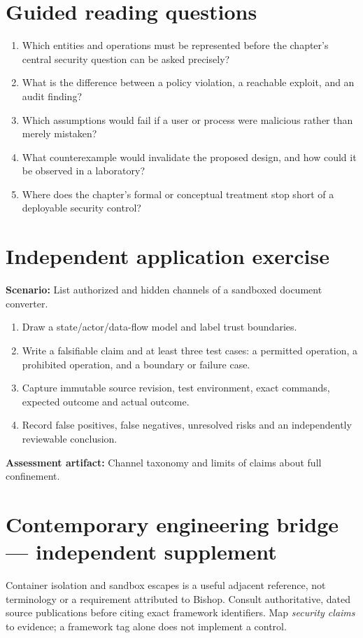\documentclass[10pt,letterpaper]{article}
\begin{document}
\section{Guided reading questions}
\begin{enumerate}
\item Which entities and operations must be represented before the chapter's central security question can be asked precisely?
\item What is the difference between a policy violation, a reachable exploit, and an audit finding?
\item Which assumptions would fail if a user or process were malicious rather than merely mistaken?
\item What counterexample would invalidate the proposed design, and how could it be observed in a laboratory?
\item Where does the chapter's formal or conceptual treatment stop short of a deployable security control?
\end{enumerate}
\section{Independent application exercise}
\textbf{Scenario:} List authorized and hidden channels of a sandboxed document converter.
\begin{enumerate}
\item Draw a state/actor/data-flow model and label trust boundaries.
\item Write a falsifiable claim and at least three test cases: a permitted operation, a prohibited operation, and a boundary or failure case.
\item Capture immutable source revision, test environment, exact commands, expected outcome and actual outcome.
\item Record false positives, false negatives, unresolved risks and an independently reviewable conclusion.
\end{enumerate}
\textbf{Assessment artifact:} Channel taxonomy and limits of claims about full confinement.
\section{Contemporary engineering bridge --- independent supplement}
Container isolation and sandbox escapes is a useful adjacent reference, not terminology or a requirement attributed to Bishop. Consult authoritative, dated source publications before citing exact framework identifiers. Map \emph{security claims} to evidence; a framework tag alone does not implement a control.
\end{document}
